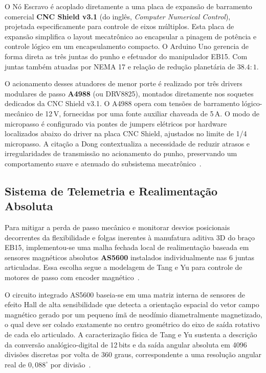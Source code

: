 O Nó Escravo é acoplado diretamente a uma placa de expansão de barramento comercial \textbf{CNC Shield v3.1} (do inglês, \textit{Computer Numerical Control}), projetada especificamente para controle de eixos múltiplos. Esta placa de expansão simplifica o layout mecatrônico ao encapsular a pinagem de potência e controle lógico em um encapsulamento compacto. O Arduino Uno gerencia de forma direta as três juntas do punho e efetuador do manipulador EB15. Com juntas também atuadas por NEMA 17 e relação de redução planetária de $38.4:1$.

O acionamento desses atuadores de menor porte é realizado por três drivers modulares de passo \textbf{A4988} (ou DRV8825), montados diretamente nos soquetes dedicados da CNC Shield v3.1. O A4988 opera com tensões de barramento lógico-mecânico de 12\,V, fornecidas por uma fonte auxiliar chaveada de 5\,A. O modo de micropasso é configurado via pontes de jumpers elétricos por hardware localizados abaixo do driver na placa CNC Shield, ajustados no limite de 1/4 micropasso. A citação a Dong contextualiza a necessidade de reduzir atrasos e irregularidades de transmissão no acionamento do punho, preservando um comportamento suave e atenuado do subsistema mecatrônico~\cite{dong2022comparative}.

\subsection{Sistema de Telemetria e Realimentação Absoluta}
\label{subsec:telemetria_sensores}

Para mitigar a perda de passo mecânico e monitorar desvios posicionais decorrentes da flexibilidade e folgas inerentes à manufatura aditiva 3D do braço EB15, implementou-se uma malha fechada local de realimentação baseada em sensores magnéticos absolutos \textbf{AS5600} instalados individualmente nas 6 juntas articuladas. Essa escolha segue a modelagem de Tang e Yu para controle de motores de passo com encoder magnético~\cite{tang2022research}.

O circuito integrado AS5600 baseia-se em uma matriz interna de sensores de efeito Hall de alta sensibilidade que detecta a orientação espacial do vetor campo magnético gerado por um pequeno ímã de neodímio diametralmente magnetizado, o qual deve ser colado exatamente no centro geométrico do eixo de saída rotativo de cada elo articulado. A caracterização física de Tang e Yu sustenta a descrição da conversão analógico-digital de 12\,bits e da saída angular absoluta em 4096 divisões discretas por volta de 360 graus, correspondente a uma resolução angular real de $0{,}088^{\circ}$ por divisão~\cite{tang2022research}.

